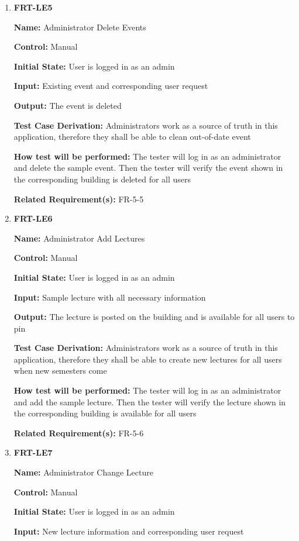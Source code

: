 \documentclass[12pt, titlepage]{article}
\begin{document}
\begin{enumerate}
\item{\textbf{FRT-LE5}}

\textbf{Name:} Administrator Delete Events

\textbf{Control:} Manual
					
\textbf{Initial State:} User is logged in as an admin

\textbf{Input:} Existing event and corresponding user request
					
\textbf{Output:} The event is deleted

\textbf{Test Case Derivation:} Administrators work as a source of truth in this application, therefore they shall be able to clean out-of-date event
					
\textbf{How test will be performed:} The tester will log in as an administrator and delete the sample event. Then the tester will verify the event shown in the corresponding building is deleted for all users 

\textbf{Related Requirement(s):} FR-5-5

\item{\textbf{FRT-LE6}}

\textbf{Name:} Administrator Add Lectures

\textbf{Control:} Manual
					
\textbf{Initial State:} User is logged in as an admin

\textbf{Input:} Sample lecture with all necessary information
					
\textbf{Output:} The lecture is posted on the building and is available for all users to pin

\textbf{Test Case Derivation:} Administrators work as a source of truth in this application, therefore they shall be able to create new lectures for all users when new semesters come
					
\textbf{How test will be performed:} The tester will log in as an administrator and add the sample lecture. Then the tester will verify the lecture shown in the corresponding building is available for all users 

\textbf{Related Requirement(s):} FR-5-6

\item{\textbf{FRT-LE7}}

\textbf{Name:} Administrator Change Lecture

\textbf{Control:} Manual
					
\textbf{Initial State:} User is logged in as an admin

\textbf{Input:} New lecture information and corresponding user request
					

\end{enumerate}
\end{document}
